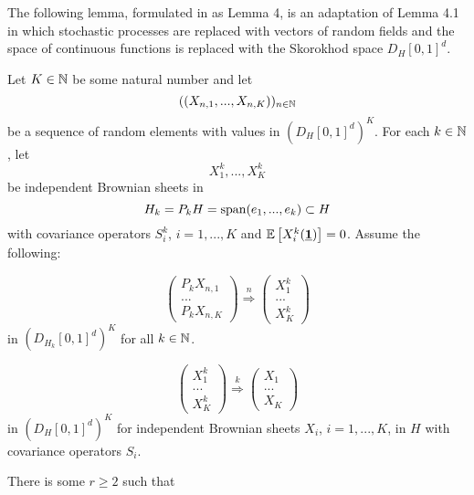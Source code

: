 The following lemma, formulated in \cite{[0]BUCCHIA2017344} as Lemma 4, is an adaptation of \cite{chen_white_1998} Lem\-ma 4.1 in which stochastic processes are replaced with vectors of random fields and the space of continuous functions is replaced with the Skorokhod space $D_H[0, 1]^d$.
\begin{lemma} \label{lemma:4} 
    Let $K \in \mathbb{N}$ be some natural number and let 
    \[ ((X_{n, 1}, ..., X_{n, K}))_{n \in \mathbb{N}} \] 
    be a sequence of random elements with values in $\left(D_H[0, 1]^d\right)^K$. For each $k \in \mathbb{N}$, let 
    \[ X^k_1, ..., X_K^k \] 
    be independent Brownian sheets in
    \[ H_k = P_k H = \mathrm{span}(e_1, ..., e_k) \subset H \]
    with covariance operators $S_i^k$, $i = 1, ..., K$ and $\EE{X_i^k(\usbf[1])} = 0$. Assume the following:
    \begin{aufzii}
        \item 
        \begin{equation} \label{lemma 4: first convergence}
            \begin{pmatrix}P_k X_{n, 1}\\ ...\\ P_k X_{n, K} \end{pmatrix} \stackrel{n}{\Rightarrow} \begin{pmatrix}X_1^k\\ ...\\ X_K^k \end{pmatrix}  
        \end{equation}
        in $\left(D_{H_k}[0, 1]^d\right)^K$ for all $k \in \mathbb{N}$.
        \item 
        \begin{equation} \label{lemma 4: second convergence}
                \begin{pmatrix}X_1^k\\ ...\\ X_K^k \end{pmatrix} \stackrel{k}{\Rightarrow} \begin{pmatrix} X_1\\ ...\\ X_K \end{pmatrix} 
        \end{equation}
        in $\left(D_{H}[0, 1]^d\right)^K$ for independent Brownian sheets $X_i$, $i = 1, ..., K$, in $H$ with covariance operators $S_i$.
        \item There is some $r \geq 2$ such that
        \begin{equation} \label{lemma 4: convergence of expected value}

\end{equation}
\end{aufzii}
\end{lemma}
